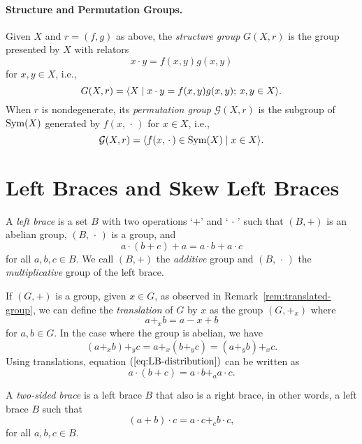 \paragraph{Structure and Permutation Groups.} Given $X$ and $r=(f,g)$ as above, the \textsl{structure group} $G(X,r)$ is the group presented by $X$ with relators
$$
     x\cdot y=f(x,y)g(x,y)
$$
for $x,y\in X$, i.e.,
$$
    G(X,r) = \langle X\mid x\cdot y=f(x,y)g(x,y);\,x,y\in X\rangle.
$$
When $r$ is nondegenerate, its \textsl{permutation group} $\mathcal G(X,r)$ is the subgroup of ${\rm Sym}(X)$ generated by $f(x,\,\cdot\,)$ for $x\in X$, i.e.,
$$
    \mathcal G(X,r) = \langle f(x,\,\cdot\,)\in{\rm Sym}(X)\mid x\in X\rangle.
$$

\section{Left Braces and Skew Left Braces}

\begin{defn}
    A \textsl{left brace} is a set\/ $B$ with two operations\/ `$+$' and\/ `$\,\cdot\,$' such that\/ $(B, +)$ is an abelian group,\/ $(B,\,\cdot\,)$ is a group, and
    \begin{equation}\label{eq:LB-distribution}
        a\cdot (b + c) + a = a\cdot b + a\cdot c
    \end{equation}
    for all\/ $a, b, c \in B$. We call\/ $(B, +)$ the \textsl{additive} group and\/ $(B, \,\cdot\,)$ the \textsl{multiplicative} group of the left brace.
\end{defn}

\begin{rem}
    If\/ $(G,+)$ is a group, given\/ $x\in G$, as observed in Remark~\ref{rem:translated-group}, we can define the \textsl{translation} of\/ $G$ by\/ $x$ as the group\/ $(G,+_x)$ where
    $$
        a +_x b = a - x + b
    $$
    for\/ $a,b\in G$. In the case where the group is abelian, we have
    $$
        (a +_x b) +_y c = a +_x (b +_y c) = (a +_y b) +_x c.
    $$
    Using translations, equation $(\ref{eq:LB-distribution})$ can be written as
    $$
        a\cdot (b+c)= a\cdot b +_a a\cdot c.
    $$
\end{rem}

\begin{defn}
    A \textsl{two-sided brace} is a left brace\/ $B$ that also is a right brace, in other words, a left brace\/ $B$ such that
    $$
        (a + b)\cdot c = a\cdot c +_c b\cdot c,
    $$
    for all\/ $a, b, c \in B$.
\end{defn}


